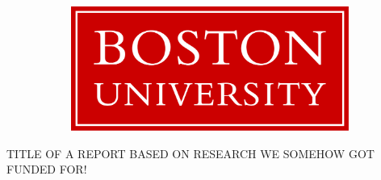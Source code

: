 \begin{titlepage}
\pagecolor{bured}
    \noindent
    \fboxsep=1mm %
    \fboxrule=1.5pt %
    \begin{figure}[t]
        \centering
            \begin{subfigure}{.5\textwidth}
                \begin{flushleft}
                    \hspace{-0em}\includegraphics[height=.1\textheight]{images/BostonUni.png}
                \end{flushleft}
            \end{subfigure}%
            \begin{subfigure}{.5\textwidth}
            \end{subfigure}
        \end{figure}
    \color{white}
    \makebox[0pt][l]{\rule{1.3\textwidth}{2pt}}
    \par
    \noindent

    \begin{center}
        \vspace{10em}
        \huge{\uppercase{Title of a report based on research we somehow got funded for!}}\\
    \end{center}


\end{titlepage}
